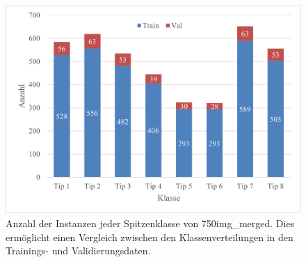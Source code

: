 \begin{figure}[h]
    \centering
    \includegraphics[trim={0.2cm 0.2cm 0.2cm 0.2cm}, clip]{img/eval/inst_per_class.png}
    \caption{Anzahl der Instanzen jeder Spitzenklasse von \glqq 750img\_merged\grqq{}. Dies ermöglicht einen Vergleich zwischen den Klassenverteilungen in den Trainings- und Validierungsdaten.}
    \label{fig:instpclass}
\end{figure}

